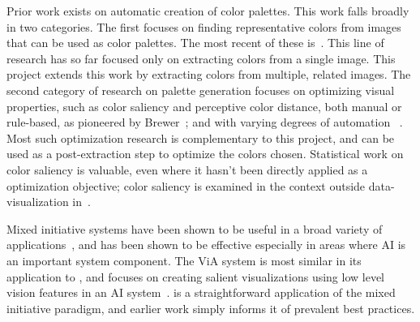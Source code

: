 Prior work exists on automatic creation of color palettes. This work falls broadly in two categories. The first focuses on finding representative  colors from images that can be used as color palettes. The most recent of these is~\cite{morse2007image}. This line of research has so far focused only on extracting colors from a single image. This project extends this work by extracting colors from multiple, related images. The second category of research on palette generation focuses on optimizing visual properties, such as color saliency and perceptive color distance, both manual or rule-based, as pioneered by Brewer~\cite{brewer1999color}; and  with varying degrees of automation ~\cite{healey1996choosing, zeileis2009RGBland}. Most such optimization research is complementary to this project, and can be used as a post-extraction step to optimize the colors chosen. Statistical work on color saliency is valuable, even where it hasn't been directly applied as a optimization objective; color saliency is examined in the context outside data-visualization in~\cite{chuang2008probabilistic, benavente2002statistical}. 

Mixed initiative systems have been shown to be useful in a broad variety of applications~\cite{hearst1999mixed}, and has been shown to be effective especially in areas where AI is an important system component. The ViA system is most similar in its application to \system, and focuses on creating salient visualizations using low level vision features in an AI system~\cite{healey2008visual}. \system is a straightforward application of the mixed initiative paradigm, and earlier work simply informs it of prevalent best practices.
